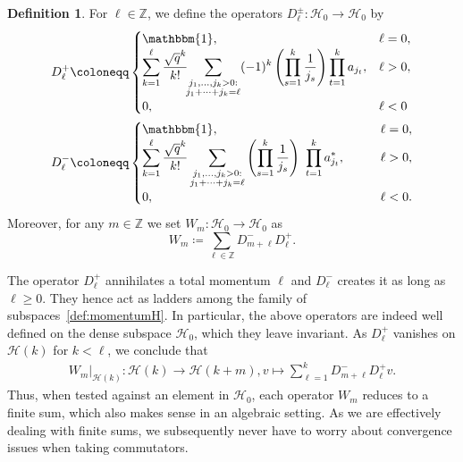 \documentclass[letterpaper, DIV=17]{scrartcl}
\numberwithin{equation}{section}
\theoremstyle{definition}
\newtheorem{defn}{Definition}[section]
\begin{document}
		\begin{defn}\label{def:DW}
		For $ \ell \in \mathbb{Z} $, we define the operators $ D_\ell^\pm : \mathcal{H}_0 \to \mathcal{H}_0  $ by
			\begin{align}\label{def:Dell}
			\begin{split}
				D_\ell^+ & \coloneqq \begin{cases}
					\mathbbm{1} ,& \ell=0, \\ 
					\displaystyle\sum_{k=1}^\ell \frac{\sqrt{q}^k}{k!} \!\! \sum_{\substack{j_1, \dots, j_k >0 : \\ j_1+\dots+j_k=\ell}} (-1)^k \left( \prod_{s=1}^k \frac{1}{j_s} \right) \prod_{t=1}^k a_{j_t},& \ell>0, \\
					0,& \ell<0
				\end{cases}  \\
				D_\ell^- & \coloneqq \begin{cases}
					\mathbbm{1} ,& \ell=0, \\ 
					\displaystyle\sum_{k=1}^\ell \frac{\sqrt{q}^k}{k!} \sum_{\substack{j_1, \dots, j_k >0 : \\ j_1+\dots+j_k=\ell}} \left( \prod_{s=1}^k \frac{1}{j_s} \right) \ \prod_{t=1}^k a_{j_t}^*,\qquad & \ell>0, \\
					0,& \ell<0.
				\end{cases}
					\end{split}
			\end{align}	
			Moreover, for any  $m\in \mathbb{Z}$  we set $  W_m :  \mathcal{H}_0 \to \mathcal{H}_0  $ as
			\begin{equation} \label{definition Wm}
				W_m \coloneqq \sum_{\ell\in \mathbb{Z}} D_{m+\ell}^- D_\ell^+ . 
			\end{equation}	
			\end{defn}
			The operator $ D_\ell^+  $ annihilates a total momentum $ \ell $ and $ D_\ell^-  $ creates it as long as $ \ell \geq 0 $. They hence act as ladders among the family of subspaces~\eqref{def:momentumH}. In particular, the above operators are indeed well defined on the dense subspace $ \mathcal{H}_0 $, which they leave invariant.  As $D_\ell^+$ vanishes on $\mathcal{H}(k)$ for $k<\ell$, we conclude that
	\begin{align*}
		W_m\vert_{\mathcal{H}(k)} : \mathcal{H}(k) \rightarrow \mathcal{H}(k+m), v \mapsto \sum_{\ell=1}^k D_{m+\ell}^- D_\ell^+ v.
	\end{align*}
	Thus, when tested against an element in $\mathcal{H}_0$, each operator $W_m$ reduces to a finite sum, which also makes sense in an algebraic setting. As we are effectively dealing with finite sums,  we subsequently never have to worry about convergence issues when taking commutators. 
\end{document}
